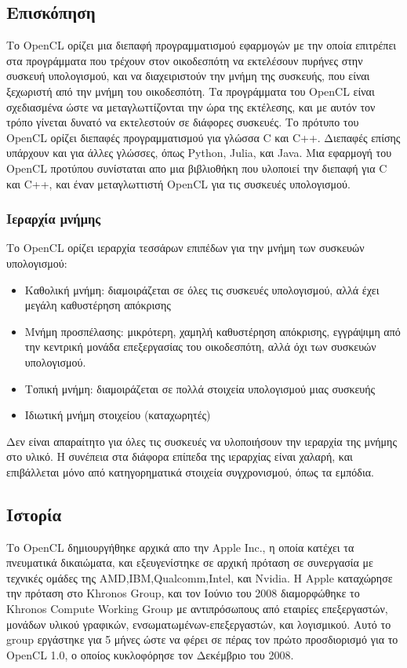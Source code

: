 \subsection{Επισκόπηση}
Το OpenCL ορίζει μια διεπαφή προγραμματισμού εφαρμογών με την οποία επιτρέπει στα προγράμματα που τρέχουν στον οικοδεσπότη να εκτελέσουν πυρήνες στην συσκευή υπολογισμού, και να διαχειριστούν την μνήμη της συσκευής, που είναι ξεχωριστή από την μνήμη του οικοδεσπότη. Τα προγράμματα του OpenCL είναι σχεδιασμένα ώστε να μεταγλωττίζονται την ώρα της εκτέλεσης, και με αυτόν τον τρόπο γίνεται δυνατό να εκτελεστούν σε διάφορες συσκευές. Το πρότυπο του OpenCL ορίζει διεπαφές προγραμματισμού για γλώσσα C και C++. Διεπαφές επίσης υπάρχουν και για άλλες γλώσσες, όπως Python, Julia, και Java. Μια εφαρμογή του OpenCL προτύπου συνίσταται απο μια βιβλιοθήκη που υλοποιεί την διεπαφή για C και C++, και έναν μεταγλωττιστή OpenCL για τις συσκευές υπολογισμού.\\
\subsubsection{Ιεραρχία μνήμης}
Το OpenCL ορίζει ιεραρχία τεσσάρων επιπέδων για την μνήμη των συσκευών υπολογισμού:
\begin{itemize}
\item Καθολική μνήμη: διαμοιράζεται σε όλες τις συσκευές υπολογισμού, αλλά έχει μεγάλη καθυστέρηση απόκρισης
\item Μνήμη προσπέλασης: μικρότερη, χαμηλή καθυστέρηση απόκρισης, εγγράψιμη από την κεντρική μονάδα επεξεργασίας του οικοδεσπότη, αλλά όχι των συσκευών υπολογισμού.
\item Τοπική μνήμη: διαμοιράζεται σε πολλά στοιχεία υπολογισμού μιας συσκευής
\item Ιδιωτική μνήμη στοιχείου (καταχωρητές) 
\end{itemize}   
Δεν είναι απαραίτητο για όλες τις συσκευές να υλοποιήσουν την ιεραρχία της μνήμης στο υλικό. Η συνέπεια στα διάφορα επίπεδα της ιεραρχίας είναι χαλαρή, και επιβάλλεται μόνο από κατηγορηματικά στοιχεία συγχρονισμού, όπως τα εμπόδια.
\subsection{Ιστορία}
Το OpenCL δημιουργήθηκε αρχικά απο την Apple Inc., η οποία κατέχει τα πνευματικά δικαιώματα, και εξευγενίστηκε σε αρχική πρόταση σε συνεργασία με τεχνικές ομάδες της AMD,IBM,Qualcomm,Intel, και Nvidia. Η Apple καταχώρησε την πρόταση στο Khronos Group, και τον Ιούνιο του 2008 διαμορφώθηκε το Khronos Compute Working Group με αντιπρόσωπους από εταιρίες επεξεργαστών, μονάδων υλικού γραφικών, ενσωματωμένων-επεξεργαστών, και λογισμικού. Αυτό το group εργάστηκε για 5 μήνες ώστε να φέρει σε πέρας τον πρώτο προσδιορισμό για το OpenCL 1.0, ο οποίος κυκλοφόρησε τον Δεκέμβριο του 2008. 
